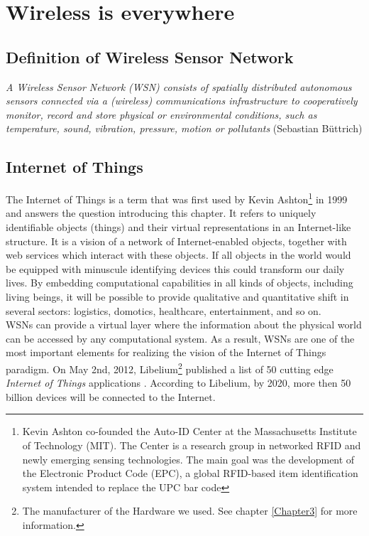 \section{Wireless is everywhere}
\subsection{Definition of Wireless Sensor Network}
\emph{A Wireless Sensor Network (WSN) consists of spatially distributed autonomous sensors connected via a (wireless) communications infrastructure to cooperatively monitor, record and store physical or
environmental conditions, such as temperature, sound, vibration, pressure, motion or pollutants} (Sebastian B\"uttrich)
\subsection{Internet of Things}
The Internet of Things is a term that was first used by Kevin Ashton\footnote{Kevin Ashton co-founded the Auto-ID Center at the  Massachusetts Institute of Technology (MIT). The Center is a research group in networked RFID and newly emerging sensing technologies. The main goal was the development of the Electronic Product Code (EPC), a global RFID-based item identification system intended to replace the UPC bar code} in 1999 and answers the question introducing this chapter. It refers to uniquely identifiable objects (things) and their virtual representations in an Internet-like structure. It is a vision of a network of Internet-enabled objects, together with web services which interact with these objects. If all objects in the world would be equipped with minuscule identifying devices this could transform our daily lives. By embedding computational capabilities in all kinds of objects, including living beings, it will be possible to provide qualitative and quantitative shift in several sectors: logistics, domotics, healthcare, entertainment, and so on.\\
WSNs can provide a virtual layer where the information about the physical world can be accessed by any computational system. As a result, WSNs are one of the most important elements for realizing the vision of the Internet of Things paradigm. On May 2nd, 2012, Libelium\footnote{The manufacturer of the Hardware we used. See chapter \ref{Chapter3} for more information.} published a list of 50 cutting edge \emph{Internet of Things} applications . According to Libelium, by 2020, more then 50 billion devices will be connected to the Internet.\\

